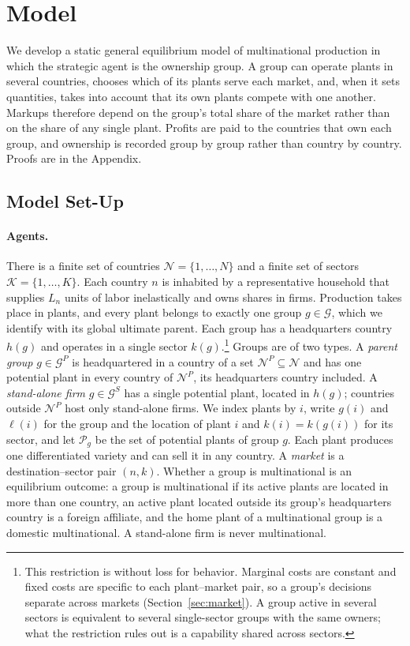 \documentclass[11pt]{article}
\theoremstyle{definition}
\theoremstyle{remark}
\newcommand{\cN}{\mathcal N}
\newcommand{\cK}{\mathcal K}
\newcommand{\cG}{\mathcal G}
\newcommand{\cP}{\mathcal P}
\begin{document}
\section{Model}
\label{sec:model}

We develop a static general equilibrium model of multinational production in which
the strategic agent is the ownership group. A group can operate plants in several
countries, chooses which of its plants serve each market, and, when it sets
quantities, takes into account that its own plants compete with one another. Markups
therefore depend on the group's total share of the market rather than on the share of
any single plant. Profits are paid to the countries that own each group, and ownership
is recorded group by group rather than country by country. Proofs are in the
Appendix.

\subsection{Model Set-Up}
\label{sec:setup}

\paragraph{Agents.} There is a finite set of countries $\cN=\{1,\dots,N\}$ and a
finite set of sectors $\cK=\{1,\dots,K\}$. Each country $n$ is inhabited by a
representative household that supplies $L_n$ units of labor inelastically and owns
shares in firms. Production takes place in plants, and every plant belongs to exactly
one group $g\in\cG$, which we identify with its global ultimate parent. Each group has
a headquarters country $h(g)$ and operates in a single sector
$k(g)$.\footnote{This restriction is without loss for behavior. Marginal costs are
constant and fixed costs are specific to each plant--market pair, so a group's
decisions separate across markets (Section~\ref{sec:market}). A group active in
several sectors is equivalent to several single-sector groups with the same owners;
what the restriction rules out is a capability shared across sectors.} Groups are of
two types. A \emph{parent group} $g\in\cG^P$ is headquartered in a country of a set
$\cN^P\subseteq\cN$ and has one potential plant in every country of $\cN^P$, its
headquarters country included. A \emph{stand-alone firm} $g\in\cG^S$ has a single
potential plant, located in $h(g)$; countries outside $\cN^P$ host only stand-alone
firms. We index plants by $i$, write $g(i)$ and $\ell(i)$ for the group and the
location of plant $i$ and $k(i)=k(g(i))$ for its sector, and let $\cP_g$ be the set of
potential plants of group $g$. Each plant produces one differentiated variety and can
sell it in any country. A \emph{market} is a destination--sector pair $(n,k)$.
Whether a group is multinational is an equilibrium outcome: a group is multinational if
its active plants are located in more than one country, an active plant located outside
its group's headquarters country is a foreign affiliate, and the home plant of a
multinational group is a domestic multinational. A stand-alone firm is never
multinational.
\end{document}
